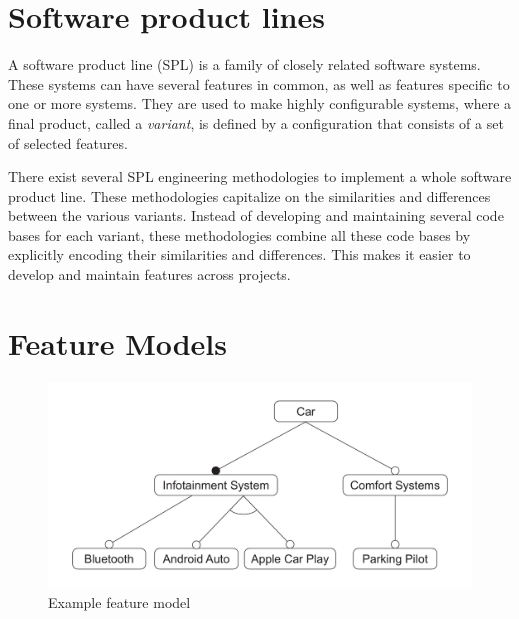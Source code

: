 \documentclass[a4paper,english]{ifimaster}
\begin{document}
\section{Software product lines}%
\label{sec:software-product-lines}

A software product line (SPL) is a family of closely related software systems. These systems can have several features in common, as well as features specific to one or more systems. They are used to make highly configurable systems, where a final product, called a \emph{variant}, is defined by a configuration that consists of a set of selected features. 

There exist several SPL engineering methodologies to implement a whole software product line. These methodologies capitalize on the similarities and differences between the various variants. Instead of developing and maintaining several code bases for each variant, these methodologies combine all these code bases by explicitly encoding their similarities and differences. This makes it easier to develop and maintain features across projects.


\section{Feature Models}
\label{sec:feature-models}

\begin{figure}
  \includegraphics[width=\textwidth]{illustrations/example.pdf}
  \caption{Example feature model \label{fig:feature-model}}
\end{figure}
\end{document}

